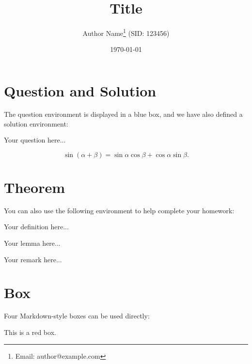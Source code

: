 \documentclass[11pt,a4paper]{article}
\begin{document}
\title{Title}
\author{Author Name\thanks{Email: author@example.com} (SID: 123456)}
\date{\today}
\maketitle




\section{Question and Solution}

{\color{blue}The question environment is displayed in a blue box, and we have also defined a solution environment:}

\begin{question}
    Your question here...
\end{question}


\begin{sol}
    \lipsum[1]
    \begin{equation}
    \sin(\alpha+\beta)=\sin \alpha \cos \beta + \cos \alpha \sin \beta.
\end{equation}
\end{sol}


\section{Theorem}
{\color{blue} You can also use the following environment to help complete your homework:}
\begin{definition}[Definition] 
Your definition here...
\end{definition}





\begin{lemma}[A Lemma]
    Your lemma here...
\end{lemma}

\begin{remark}[A Remark]
    Your remark here...
    \experiment \take \intuition
\end{remark}

   
\section{Box}
{\color{blue} Four Markdown-style boxes can be used directly:}

\begin{redbox}
    This is a red box.
\end{redbox}
\end{document}

